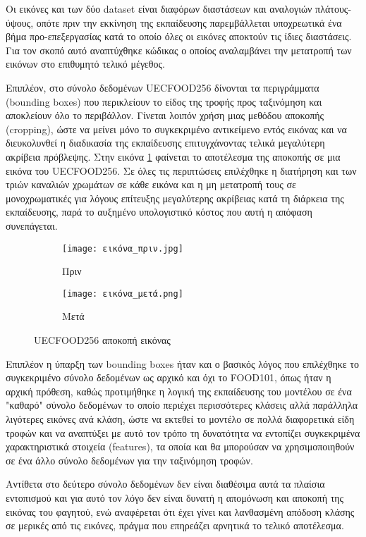 Οι εικόνες και των δύο dataset είναι διαφόρων διαστάσεων και αναλογιών πλάτους-ύψους, οπότε πριν την εκκίνηση της εκπαίδευσης παρεμβάλλεται υποχρεωτικά ένα βήμα προ-επεξεργασίας κατά το οποίο όλες οι εικόνες αποκτούν τις ίδιες διαστάσεις. Για τον σκοπό αυτό αναπτύχθηκε κώδικας ο οποίος αναλαμβάνει την μετατροπή των εικόνων στο επιθυμητό τελικό μέγεθος.

Επιπλέον, στο σύνολο δεδομένων UECFOOD256 δίνονται τα περιγράμματα (bounding boxes) που περικλείουν το είδος της τροφής προς ταξινόμηση και αποκλείουν όλο το περιβάλλον. Γίνεται λοιπόν χρήση μιας μεθόδου αποκοπής (cropping), ώστε να μείνει μόνο το συγκεκριμένο αντικείμενο εντός εικόνας και να διευκολυνθεί η διαδικασία της εκπαίδευσης επιτυγχάνοντας τελικά μεγαλύτερη ακρίβεια πρόβλεψης. Στην εικόνα \ref{Crop_image} φαίνεται το αποτέλεσμα της αποκοπής σε μια εικόνα του UECFOOD256. Σε όλες τις περιπτώσεις επιλέχθηκε η διατήρηση και των τριών καναλιών χρωμάτων σε κάθε εικόνα και η μη μετατροπή τους σε μονοχρωματικές για λόγους επίτευξης μεγαλύτερης ακρίβειας κατά τη διάρκεια της εκπαίδευσης, παρά το αυξημένο υπολογιστικό κόστος που αυτή η απόφαση συνεπάγεται.

\begin{figure}[H]
\centering
\begin{subfigure}[t]{0.5\textwidth}%
\texttt{[image: εικόνα\_πριν.jpg]}
\caption{Πριν}
\end{subfigure}%
\begin{subfigure}[t]{0.5\textwidth}%
\texttt{[image: εικόνα\_μετά.png]}
\caption{Μετά}
\end{subfigure} 
\caption{UECFOOD256 αποκοπή εικόνας}
\label{Crop_image}
\end{figure}

Επιπλέον η ύπαρξη των bounding boxes ήταν και ο βασικός λόγος που επιλέχθηκε το συγκεκριμένο σύνολο δεδομένων ως αρχικό και όχι το FOOD101, όπως ήταν η αρχική πρόθεση, καθώς προτιμήθηκε η λογική της εκπαίδευσης του μοντέλου σε ένα "καθαρό" σύνολο δεδομένων το οποίο περιέχει περισσότερες κλάσεις αλλά παράλληλα λιγότερες εικόνες ανά κλάση, ώστε να εκτεθεί το μοντέλο σε πολλά διαφορετικά είδη τροφών και να αναπτύξει με αυτό τον τρόπο τη δυνατότητα να εντοπίζει συγκεκριμένα χαρακτηριστικά στοιχεία (features), τα οποία και θα μπορούσαν να χρησιμοποιηθούν σε ένα άλλο σύνολο δεδομένων για την ταξινόμηση τροφών. 

Αντίθετα στο δεύτερο σύνολο δεδομένων δεν είναι διαθέσιμα αυτά τα πλαίσια εντοπισμού και για αυτό τον λόγο δεν είναι δυνατή η απομόνωση και αποκοπή της εικόνας του φαγητού, ενώ αναφέρεται ότι έχει γίνει και λανθασμένη απόδοση κλάσης σε μερικές από τις εικόνες, πράγμα που επηρεάζει αρνητικά το τελικό αποτέλεσμα.

